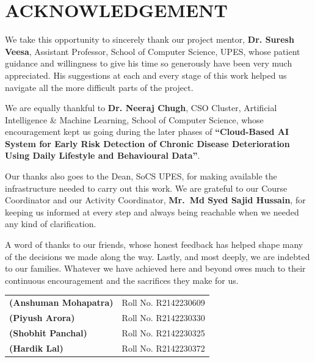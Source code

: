 \documentclass[12pt,a4paper]{report}
\begin{document}
\newpage

\chapter*{ACKNOWLEDGEMENT}
\thispagestyle{fancy}

We take this opportunity to sincerely thank our project mentor, \textbf{Dr. Suresh Veesa}, Assistant Professor, School of Computer Science, UPES, whose patient guidance and willingness to give his time so generously have been very much appreciated. His suggestions at each and every stage of this work helped us navigate all the more difficult parts of the project.

We are equally thankful to \textbf{Dr. Neeraj Chugh}, CSO Cluster, Artificial Intelligence \& Machine Learning, School of Computer Science, whose encouragement kept us going during the later phases of \textbf{``Cloud-Based AI System for Early Risk Detection of Chronic Disease Deterioration Using Daily Lifestyle and Behavioural Data''}.

Our thanks also goes to the Dean, SoCS UPES, for making available the infrastructure needed to carry out this work. We are grateful to our Course Coordinator and our Activity Coordinator, \textbf{Mr.\ Md Syed Sajid Hussain}, for keeping us informed at every step and always being reachable when we needed any kind of clarification.

A word of thanks to our friends, whose honest feedback has helped shape many of the decisions we made along the way. Lastly, and most deeply, we are indebted to our families. Whatever we have achieved here and beyond owes much to their continuous encouragement and the sacrifices they make for us.

\vspace{1cm}

\begin{tabular}{ll}
\textbf{(Anshuman Mohapatra)} & Roll No. R2142230609 \\[12pt]
\textbf{(Piyush Arora)} & Roll No. R2142230330 \\[12pt]
\textbf{(Shobhit Panchal)} & Roll No. R2142230325 \\[12pt]
\textbf{(Hardik Lal)} & Roll No. R2142230372 \\
\end{tabular}

\newpage
\end{document}
